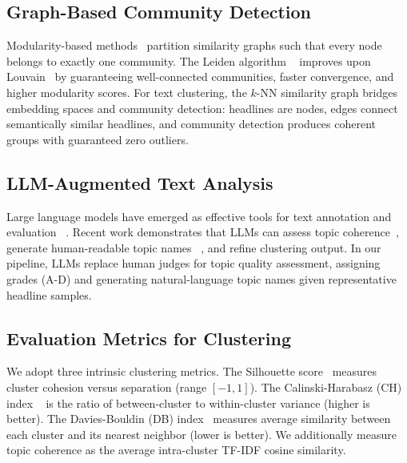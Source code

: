 \documentclass[10pt,twocolumn,twoside]{article}
\begin{document}
\subsection{Graph-Based Community Detection}
Modularity-based methods~\citep{newman2006modularity, newman2004finding} partition similarity 
graphs such that every node belongs to exactly one community. The Leiden algorithm 
~\citep{traag2019leiden} improves upon Louvain~\citep{blondel2008fast} by guaranteeing 
well-connected communities, faster convergence, and higher modularity scores. For text 
clustering, the $k$-NN similarity graph bridges embedding spaces and community detection: 
headlines are nodes, edges connect semantically similar headlines, and community detection 
produces coherent groups with guaranteed zero outliers.

\subsection{LLM-Augmented Text Analysis}
Large language models have emerged as effective tools for text annotation and evaluation 
~\citep{wang2023llm, chang2023llm}. Recent work demonstrates that LLMs can assess topic 
coherence~\citep{viswanathan2023llm}, generate human-readable topic names 
~\citep{zhang2024llm}, and refine clustering output. In our pipeline, LLMs replace human 
judges for topic quality assessment, assigning grades (A-D) and generating natural-language 
topic names given representative headline samples.

\subsection{Evaluation Metrics for Clustering}
We adopt three intrinsic clustering metrics. The Silhouette score~\citep{rousseeuw1987silhouettes} 
measures cluster cohesion versus separation (range $[-1,1]$). The Calinski-Harabasz (CH) index 
~\citep{calinski1974dendrite} is the ratio of between-cluster to within-cluster variance 
(higher is better). The Davies-Bouldin (DB) index~\citep{davies1979cluster} measures average 
similarity between each cluster and its nearest neighbor (lower is better). We additionally 
measure topic coherence as the average intra-cluster TF-IDF cosine similarity.
\end{document}

